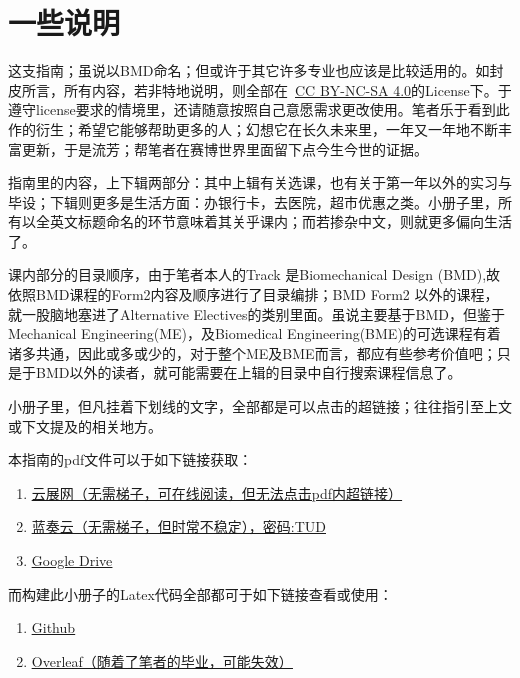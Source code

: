 \section{一些说明}
这支指南；虽说以BMD命名；但或许于其它许多专业也应该是比较适用的。如封皮所言，所有内容，若非特地说明，则全部在\ccbyncsa\ \href{http://creativecommons.org/licenses/by-nc-sa/4.0/}{\uline{CC BY-NC-SA 4.0}}的License下。于遵守license要求的情境里，还请随意按照自己意愿需求更改使用。笔者乐于看到此作的衍生；希望它能够帮助更多的人；幻想它在长久未来里，一年又一年地不断丰富更新，于是流芳；帮笔者在赛博世界里面留下点今生今世的证据。

指南里的内容，上下辑两部分：其中上辑有关选课，也有关于第一年以外的实习与毕设；下辑则更多是生活方面：办银行卡，去医院，超市优惠之类。小册子里，所有以全英文标题命名的环节意味着其关乎课内；而若掺杂中文，则就更多偏向生活了。

课内部分的目录顺序，由于笔者本人的Track 是Biomechanical Design (BMD),故依照BMD课程的Form2内容及顺序进行了目录编排；BMD Form2 以外的课程，就一股脑地塞进了Alternative Electives的类别里面。虽说主要基于BMD，但鉴于Mechanical Engineering(ME)，及Biomedical Engineering(BME)的可选课程有着诸多共通，因此或多或少的，对于整个ME及BME而言，都应有些参考价值吧；只是于BMD以外的读者，就可能需要在上辑的目录中自行搜索课程信息了。

小册子里，但凡挂着下划线的文字，全部都是可以点击的超链接；往往指引至上文或下文提及的相关地方。

本指南的pdf文件可以于如下链接获取：
\begin{enumerate}
\item \href{https://book.yunzhan365.com/bahjx/upyq/mobile/index.html}{\uline{云展网（无需梯子，可在线阅读，但无法点击pdf内超链接）}}
\item \href{https://wwkg.lanzoup.com/b04q5cmch}{\uline{蓝奏云（无需梯子，但时常不稳定），密码:TUD}}
\item \href{https://drive.google.com/drive/folders/1rxghlV072abqS7_6GpjdmStmXHPLw4bG?usp=sharing}{\uline{Google Drive}} 
\end{enumerate}

而构建此小册子的Latex代码全部都可于如下链接查看或使用：
\begin{enumerate}
\item \href{https://github.com/HochanWang/BMD-ZhiNan}{\uline{Github}}
\item \href{https://www.overleaf.com/9181971742xyhrjrdxdzkt}{\uline{Overleaf（随着了笔者的毕业，可能失效）}}
\end{enumerate}

